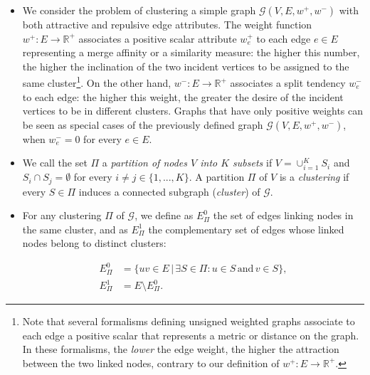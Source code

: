 \begin{itemize}
\item {} We consider the problem of clustering a simple graph $\mathcal{G}(V,E,w^+, w^-)$ with both attractive and repulsive edge attributes. The weight function $w^+: E \rightarrow \mathbb{R}^+$ associates a positive scalar attribute $w_e^+$ to each edge $e \in E$ representing a merge affinity or a similarity measure: the higher this number, the higher the inclination of the two incident vertices to be assigned to the same cluster\footnote{Note that several formalisms defining unsigned weighted graphs associate to each edge a positive scalar that represents a metric or distance on the graph. In these formalisms, the \emph{lower} the edge weight, the higher the attraction between the two linked nodes, contrary to our definition of $w^+: E \rightarrow \mathbb{R}^+$.}. On the other hand, $w^-: E \rightarrow \mathbb{R}^+$ associates a split tendency $w_e^-$ to each edge: the higher this weight, the greater the desire of the incident vertices to be in different clusters.
Graphs that have only positive weights can be seen as special cases of the previously defined graph $\mathcal{G}(V,E,w^+,w^-)$, when $w^-_e=0$ for every $e \in E$.   

\item We call the set $\Pi$ a \emph{partition of nodes $V$ into $K$ subsets} if $V = \cup_{i=1}^K S_i $ and $S_i \cap S_j = \emptyset$ for every $i\neq j \in \{1, ..., K\}$. A partition $\Pi$ of $V$ is a \emph{clustering} if every $S \in \Pi$ induces a connected subgraph (\emph{cluster}) of $\mathcal{G}$.
\item For any clustering $\Pi$ of $\mathcal{G}$, we define as $E^0_\Pi$ the set of edges linking nodes in the same cluster, and as $E_\Pi^1$ the complementary set of edges whose linked nodes belong to distinct clusters:

\begin{align}
E_\Pi^0 &= \{ uv \in E \,|\, \exists S \in \Pi : u \in S \, \text{and} \, v \in S \}, \\
E^1_\Pi &= E \setminus E^0_\Pi.
\end{align}


\end{itemize}
